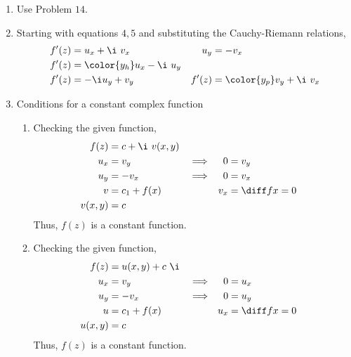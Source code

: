 \begin{enumerate}
    \item Use Problem $ 14 $.

    \item Starting with equations $ 4, 5 $ and substituting the Cauchy-Riemann
          relations,
          \begin{align}
              f'(z) & = u_x + \i\ v_x             &
              u_y   & = -v_x                        \\
              f'(z) & = \color{y_h} u_x - \i\ u_y   \\
              f'(z) & = -\i u_y + v_y             &
              f'(z) & = \color{y_p} v_y + \i\ v_x
          \end{align}

    \item Conditions for a constant complex function
          \begin{enumerate}
              \item Checking the given function,
                    \begin{align}
                        f(z)             & = c + \i\ v(x, y)   \\
                        u_x              & = v_y             &
                        \implies \quad 0 & = v_y               \\
                        u_y              & = -v_x            &
                        \implies \quad 0 & = v_x               \\
                        v                & = c_1 + f(x)      &
                        v_x              & = \diff fx = 0      \\
                        v(x, y)          & = c
                    \end{align}
                    Thus, $f(z)$ is a constant function.

              \item Checking the given function,
                    \begin{align}
                        f(z)             & = u(x, y) + c\ \i   \\
                        u_x              & = v_y             &
                        \implies \quad 0 & = u_x               \\
                        u_y              & = -v_x            &
                        \implies \quad 0 & = u_y               \\
                        u                & = c_1 + f(x)      &
                        u_x              & = \diff fx = 0      \\
                        u(x, y)          & = c
                    \end{align}
                    Thus, $f(z)$ is a constant function.


\end{enumerate}
\end{enumerate}
